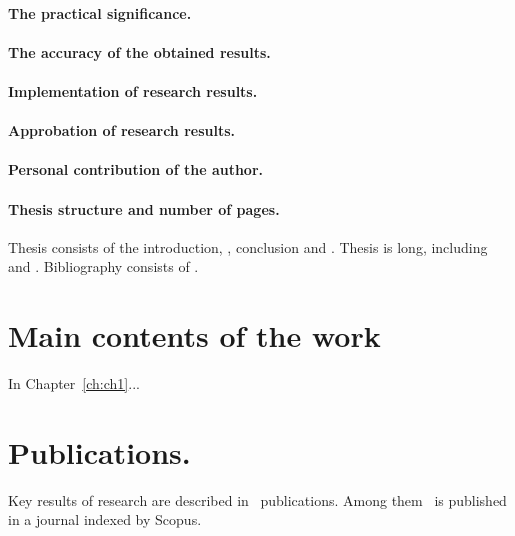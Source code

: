 \paragraph*{The practical significance.}
\paragraph*{The accuracy of the obtained results.}

\paragraph*{Implementation of research results.}
\paragraph*{Approbation of research results.}
\paragraph*{Personal contribution of the author.}
\paragraph*{Thesis structure and number of pages.}

Thesis consists of the introduction,
,
conclusion and 
.
Thesis is 
 long, including
 and
.
Bibliography consists of
.


\newpage
\section*{Main contents of the work}

In Chapter~\ref{ch:ch1}...

\section*{Publications.}

Key results of research are described in \theAllMyPapers~publications. 
Among them
\theScopusPapers~is published in a journal indexed by Scopus. 



